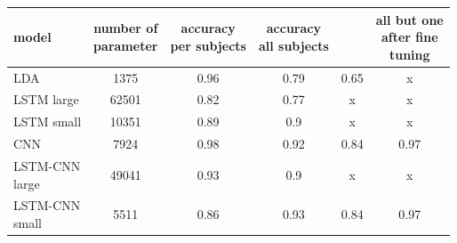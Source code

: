 \documentclass[
12pt, %
english, %
doublespacing, %
headsepline, %
]{MastersDoctoralThesis} %
\begin{document}
\vspace{0.4cm}	
\begin{table}[t]
	\label{table:AllAverageedResults}
	\centering
	\begin{tabular}{l|ccccc}
		\toprule
		model &  \makecell{number of \\parameter} &  \makecell{accuracy \\
			per subjects} & \makecell{accuracy \\
			all subjects}&\makecell{all but one}&\makecell{all but one \\ after fine\\tuning}\\
		\midrule
		LDA            &            1375 &                   0.96 &                  0.79 &                           0.65 &                                                 x \\
		LSTM large       &          62501 &                   0.82 &                  0.77 &                              x &                                                 x \\
		LSTM small     &           10351 &                   0.89 &                   0.9 &                              x &                                                 x \\
		CNN            &            7924 &                   0.98 &                  0.92 &                           0.84 &                                              0.97 \\
		\makecell{LSTM-CNN\\large}&           49041 &                   0.93 &                   0.9 &                              x &                                                 x \\
		\makecell{LSTM-CNN\\small}&            5511 &                   0.86 &                  0.93 &                           0.84 &                                              0.97 \\
		\bottomrule
	\end{tabular}
	
\end{table}
\end{document}
